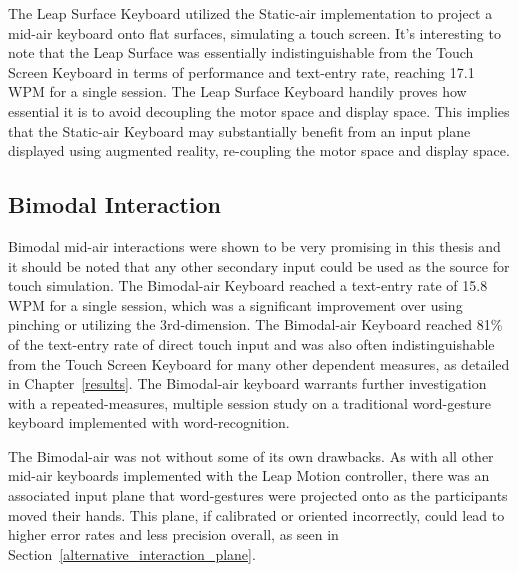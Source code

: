 The Leap Surface Keyboard utilized the Static-air implementation to project a mid-air keyboard onto flat surfaces, simulating a touch screen. It's interesting to note that the Leap Surface was essentially indistinguishable from the Touch Screen Keyboard in terms of performance and text-entry rate, reaching 17.1 WPM for a single session. The Leap Surface Keyboard handily proves how essential it is to avoid decoupling the motor space and display space. This implies that the Static-air Keyboard may substantially benefit from an input plane displayed using augmented reality, re-coupling the motor space and display space.

\subsection{Bimodal Interaction}
Bimodal mid-air interactions were shown to be very promising in this thesis and it should be noted that any other secondary input could be used as the source for touch simulation. The Bimodal-air Keyboard reached a text-entry rate of 15.8 WPM for a single session, which was a significant improvement over using pinching or utilizing the 3rd-dimension. The Bimodal-air Keyboard reached 81\% of the text-entry rate of direct touch input and was also often indistinguishable from the Touch Screen Keyboard for many other dependent measures, as detailed in Chapter~\ref{results}. The Bimodal-air keyboard warrants further investigation with a repeated-measures, multiple session study on a traditional word-gesture keyboard implemented with word-recognition.

The Bimodal-air was not without some of its own drawbacks. As with all other mid-air keyboards implemented with the Leap Motion controller, there was an associated input plane that word-gestures were projected onto as the participants moved their hands. This plane, if calibrated or oriented incorrectly, could lead to higher error rates and less precision overall, as seen in Section~\ref{alternative_interaction_plane}.


